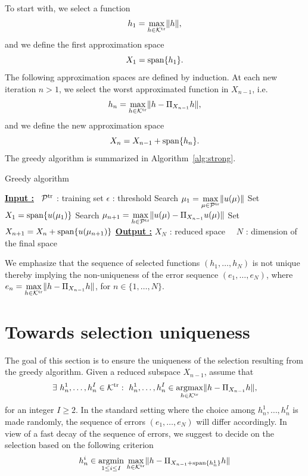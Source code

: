 \documentclass[12pt,a4paper]{article}
\newcommand{\Ptr}{\mathcal P^{\rm tr}}
\newcommand{\calK}{\mathcal K}
\newcommand{\Ktr}{\calK^{\rm tr}}
\begin{document}
To start with, we select a function 
\begin{equation}
h_1 = \underset{h\in\Ktr}{\rm max}\|h\|,
\end{equation}
and we define the first approximation space
\begin{equation}
 X_1 = {\rm span}\{h_1\}.
\end{equation}
The following approximation spaces are defined by induction. 
At each new iteration $n>1$, we select the worst approximated function in $X_{n-1}$, i.e.
\begin{equation}
h_n = \underset{h\in\Ktr}{\rm max}\|h-\Pi_{X_{n-1}}h\|,
\end{equation}
and we define the new approximation space
\begin{equation}
 X_n = X_{n-1} + {\rm span}\{h_n\}.
\end{equation}
The greedy algorithm is summarized in Algorithm~\ref{alg:strong}.

 \begin{algorithm}[H]
\caption{Greedy algorithm}\label{alg:strong}
\begin{algorithmic}[1]
\Statex \textbf{\underline{Input :}}
\ $\Ptr$ : training set
\Statex\qquad\qquad $\epsilon$ : threshold
\State Search $\mu_1 = \underset{\mu\in\Ptr}{\rm max}\|u(\mu)\|$
\State Set $X_1 = {\rm span}\{u(\mu_1)\}$
\While{ $>\epsilon$}
\State Search $\mu_{n+1} = \underset{h\in\Ptr}{\rm max}\|u(\mu)-\Pi_{X_{n-1}}u(\mu)\|$
\State Set $X_{n+1} = X_n+ {\rm span}\{u(\mu_{n+1})\}$
\EndWhile
\Statex \textbf{\underline {Output :}}
$ X_N$ : reduced space
\Statex \qquad\qquad\ \ ${N}$ : dimension of the final space
\vspace{0.2cm}
\end{algorithmic}
\end{algorithm}
We emphasize that the sequence of selected functions $(h_1,\ldots,h_N)$ is not unique thereby implying the non-uniqueness of the error sequence $(e_1,\ldots,e_N)$, where $e_n = \underset{h\in\Ktr}{\rm max}\|h-\Pi_{X_{n-1}}h\|$, for $n\in\{1,\ldots,N\}$.

\section{Towards selection uniqueness}
The goal of this section is to ensure the uniqueness of the selection resulting from the greedy algorithm. 
Given a reduced subspace $X_{n-1}$, assume that
\begin{equation}
\exists\ h_n^1, \ldots, h_n^I\in\Ktr: \ 
h_n^1, \ldots, h_n^I\in \underset{h\in\Ktr}{\rm argmax}\|h-\Pi_{X_{n-1}}h\|,
\end{equation}
for an integer $I\geq 2$.
In the standard setting where the choice among $h_n^1,\ldots,h_n^I$ is made randomly, the sequence of errors $(e_1,\ldots,e_N)$ will differ accordingly. In view of a fast decay of the sequence of errors, we suggest to decide on the selection based on the following criterion
\begin{equation}
 h_n^i\in\underset{1\leq i\leq I}{\rm argmin}\ \underset{h\in\Ktr}{\rm max}\|h-\Pi_{X_{n-1}+{\rm span}\{h_n^1\}}h\|
\end{equation}
\end{document}
